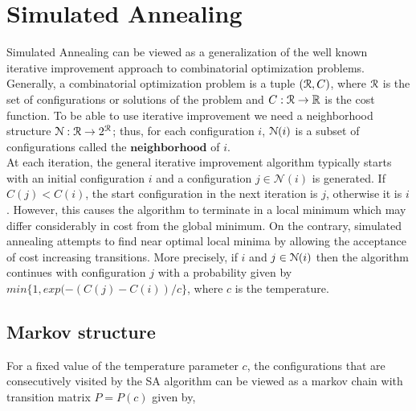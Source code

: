 \documentclass[letterpaper,english,10pt]{article}
\begin{document}
\section{Simulated Annealing}
Simulated Annealing\cite{ref3} can be viewed as a generalization of the well known iterative improvement approach to combinatorial optimization problems. Generally, a combinatorial optimization problem is a tuple $(\mathcal{R},C)$, where $\mathcal{R}$ is the set of configurations or solutions of the problem and $C:  \mathcal{R} \rightarrow \mathbb{R} $ is the cost function. To be able to use iterative improvement we need a neighborhood structure $\mathcal{N}: \mathcal{R} \rightarrow 2^{\mathcal{R}}$; thus, for each configuration $i$, $\mathcal{N}(i)$ is a subset of configurations called the $\textbf{neighborhood}$ of $i$.\\ 

At each iteration, the general iterative improvement algorithm typically starts with an initial configuration $i$ and a configuration $j \in \mathcal{N}(i)$ is generated. If $C(j) < C(i)$, the start configuration in the next iteration is $j$, otherwise it is $i$. However, this causes the algorithm to terminate in a local minimum which may differ considerably in cost from the global minimum.
On the contrary, simulated annealing attempts to find near optimal local minima by allowing the acceptance of cost increasing transitions. More precisely, if $i$ and $j \in \mathcal{N}(i)$ then the algorithm continues with configuration $j$ with a probability given by $min\{1, exp(-(C(j) -C(i))/c\}$, where $c$ is the temperature.

\subsection{Markov structure}
For a fixed value of the temperature parameter $c$, the configurations that are consecutively visited by the SA algorithm can be viewed as a markov chain with transition matrix $P = P(c)$ given by,
\end{document}
